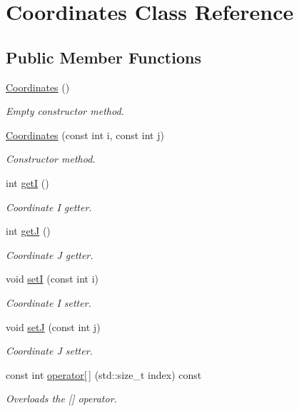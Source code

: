 \hypertarget{class_coordinates}{}\section{Coordinates Class Reference}
\label{class_coordinates}
\subsection*{Public Member Functions}
\begin{DoxyCompactItemize}
\item 
\mbox{\hyperlink{class_coordinates_a89dd10af87d803fd51dfd9987f32e8cd}{Coordinates}} ()
\begin{DoxyCompactList}\small\item\em Empty constructor method. \end{DoxyCompactList}\item 
\mbox{\hyperlink{class_coordinates_ad95ddcb50cb3b0a6f6b432c32493ac2c}{Coordinates}} (const int i, const int j)
\begin{DoxyCompactList}\small\item\em Constructor method. \end{DoxyCompactList}\item 
int \mbox{\hyperlink{class_coordinates_a5f5709f7344088056ce16636140dfcef}{getI}} ()
\begin{DoxyCompactList}\small\item\em Coordinate I getter. \end{DoxyCompactList}\item 
int \mbox{\hyperlink{class_coordinates_ab9a94dc522140925ab3b05fe9a2b9f17}{getJ}} ()
\begin{DoxyCompactList}\small\item\em Coordinate J getter. \end{DoxyCompactList}\item 
void \mbox{\hyperlink{class_coordinates_aff6e2b2340430c5b5f0ba24a987c99a2}{setI}} (const int i)
\begin{DoxyCompactList}\small\item\em Coordinate I setter. \end{DoxyCompactList}\item 
void \mbox{\hyperlink{class_coordinates_a3e0fb7ab12e0781ad4544a9c8b91edb4}{setJ}} (const int j)
\begin{DoxyCompactList}\small\item\em Coordinate J setter. \end{DoxyCompactList}\item 
const int \mbox{\hyperlink{class_coordinates_aa0645b4894d9d34cd78a4c6a1b44e30c}{operator\mbox{[}$\,$\mbox{]}}} (std\+::size\+\_\+t index) const
\begin{DoxyCompactList}\small\item\em Overloads the \mbox{[}\mbox{]} operator. \end{DoxyCompactList}\end{DoxyCompactItemize}


